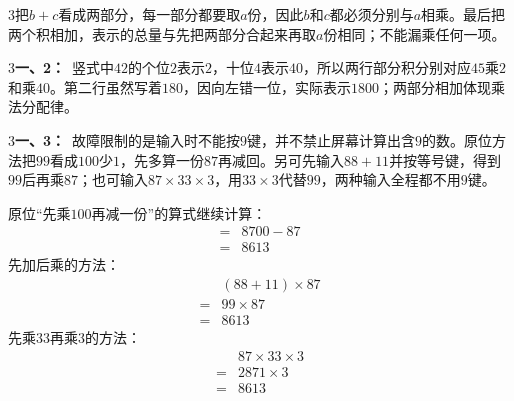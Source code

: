 \documentclass[multi=snippet,border={5bp 20bp 5bp 5bp}]{standalone}
\newenvironment{snippet}[3]{\begin{minipage}{#1bp}\color{answerred}\fontsize{#2}{#3}\selectfont\raggedright}{\end{minipage}}
\begin{document}
\begin{snippet}{505}{11.5}{14}\begin{multicols}{3}\raggedcolumns 把\(b+c\)\allowbreak 看成两部分，每一部分都要取\(a\)\allowbreak 份，因此\(b\)\allowbreak 和\(c\)\allowbreak 都必须分别与\(a\)\allowbreak 相乘。最后把两个积相加，表示的总量与先把两部分合起来再取\(a\)\allowbreak 份相同；不能漏乘任何一项。\end{multicols}\end{snippet}
\begin{snippet}{505}{11.5}{14}\begin{multicols}{3}\raggedcolumns \textbf{一、2：}\ 竖式中\(42\)\allowbreak 的个位\(2\)\allowbreak 表示\(2\)\allowbreak ，十位\(4\)\allowbreak 表示\(40\)\allowbreak ，所以两行部分积分别对应\(45\)\allowbreak 乘\(2\)\allowbreak 和乘\(40\)\allowbreak 。第二行虽然写着\(180\)\allowbreak ，因向左错一位，实际表示\(1800\)\allowbreak ；两部分相加体现乘法分配律。\end{multicols}\end{snippet}
\begin{snippet}{505}{11.5}{14}\begin{multicols}{3}\raggedcolumns \textbf{一、3：}\ 故障限制的是输入时不能按\(9\)\allowbreak 键，并不禁止屏幕计算出含\(9\)\allowbreak 的数。原位方法把\(99\)\allowbreak 看成\(100\)\allowbreak 少\(1\)\allowbreak ，先多算一份\(87\)\allowbreak 再减回。另可先输入\(88+11\)\allowbreak 并按等号键，得到\(99\)\allowbreak 后再乘\(87\)\allowbreak ；也可输入\(87\times33\times3\)\allowbreak ，用\(33\times3\)\allowbreak 代替\(99\)\allowbreak ，两种输入全程都不用\(9\)\allowbreak 键。\par 原位“先乘\(100\)\allowbreak 再减一份”的算式继续计算：\[\begin{aligned}={}&8700-87\\={}&8613\end{aligned}\]先加后乘的方法：\[\begin{aligned}&(88+11)\times87\\={}&99\times87\\={}&8613\end{aligned}\]先乘\(33\)\allowbreak 再乘\(3\)\allowbreak 的方法：\[\begin{aligned}&87\times33\times3\\={}&2871\times3\\={}&8613\end{aligned}\]\end{multicols}\end{snippet}
\end{document}
